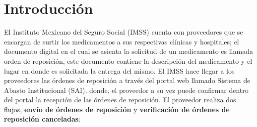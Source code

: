 \documentclass[a4paper,10pt]{article}
\begin{document}
\section{Introducción}
El Instituto Mexicano del Seguro Social (IMSS) cuenta con proveedores que se encargan de surtir los medicamentos a sus respectivas clínicas y hospitales; el documento digital en el cual se asienta la solicitud de un medicamento es llamada orden de reposición, este documento contiene la descripción del medicamento y el lugar en donde es solicitada la entrega del mismo. El IMSS hace llegar a los proveedores las órdenes de reposición a través del portal web llamado Sistema de Abasto Institucional (SAI), donde, el proveedor a su vez puede confirmar dentro del portal la recepción de las órdenes de reposición. El proveedor realiza dos flujos, \textbf{envío de órdenes de reposición} y \textbf{verificación de órdenes de reposición canceladas}:
\end{document}
